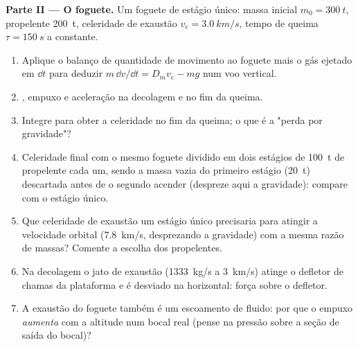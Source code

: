 \begin{problem}
\medskip
\noindent\textbf{Parte II --- O foguete.}
Um foguete de estágio único: massa inicial $m_0 = \qty{300}{t}$, propelente
\qty{200}{t}, celeridade de exaustão $v_e = \qty{3.0}{km/s}$, tempo de queima $\tau =
\qty{150}{s}$ a  constante.
\begin{enumerate}[resume]
  \item Aplique o balanço de quantidade de movimento ao foguete mais o gás ejetado em
        $\dd t$ para deduzir $m\,\dd v/\dd t = D_mv_e - mg$ num voo
        vertical.
  \item {}, empuxo e aceleração na decolagem e
        no fim da queima.
  \item Integre para obter a celeridade no fim da queima; o que é a "perda
        por gravidade"?
  \item Celeridade final com o mesmo foguete dividido em dois estágios de
        \qty{100}{t} de propelente cada um, sendo a massa vazia do primeiro
        estágio (\qty{20}{t}) descartada antes de o segundo acender (despreze
        aqui a gravidade): compare com o estágio único.
  \item Que celeridade de exaustão um estágio único precisaria para atingir a
        velocidade orbital (\qty{7.8}{km/s}, desprezando a gravidade) com a mesma
        razão de massas? Comente a escolha dos propelentes.
  \item Na decolagem o jato de exaustão (\qty{1333}{kg/s} a \qty{3}{km/s}) atinge
        o defletor de chamas da plataforma e é desviado na horizontal:
        força sobre o defletor.
  \item A exaustão do foguete também é um escoamento de fluido: por que o empuxo
        \emph{aumenta} com a altitude num bocal real (pense na
        pressão sobre a seção de saída do bocal)?
\end{enumerate}


\end{problem}
